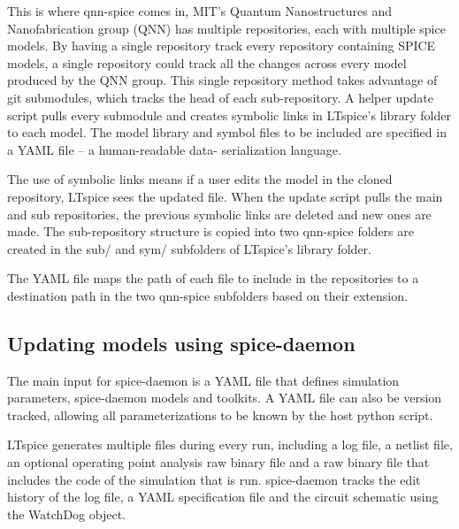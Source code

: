 \documentclass{article}
\newcommand{\cf}[1]{\textsf{#1}}
\begin{document}
This is where qnn-spice comes in, MIT's Quantum Nanostructures and Nanofabrication group (QNN) has multiple
repositories, each with multiple spice models. By having a single repository track every repository containing
SPICE models, a single repository could track all the changes across every model produced by the QNN group. 
This single repository method takes advantage of git submodules, which tracks the head of each sub-repository.
A helper update script pulls every submodule and creates symbolic links in LTspice's library folder to each model.
The model library and symbol files to be included are specified in a YAML file -- a human-readable data-
serialization language.

The use of symbolic links means if a user edits the model in the cloned repository, LTspice sees the updated file.
When the update script pulls the main and sub repositories, the previous symbolic links are deleted and new ones are 
made. The sub-repository structure is copied into two \cf{qnn-spice} folders are created in the \cf{sub/} and \cf{sym/} 
subfolders of LTspice's library folder. 

The YAML file maps the path of each file to include in the repositories to a destination path in the two
\cf{qnn-spice} subfolders based on their extension. 



\subsection{Updating models using spice-daemon}

The main input for spice-daemon is a YAML file that defines simulation parameters, spice-daemon models and
toolkits. A YAML file can also be version tracked, allowing all parameterizations to be known by the host
python script.

LTspice generates multiple files during every run, including a log file, a netlist file, an optional 
operating point analysis raw binary file and a raw binary file that includes the code of the simulation 
that is run. spice-daemon tracks the edit history of the log file, a YAML specification file and the 
circuit schematic using the \cf{WatchDog} object.
\end{document}
